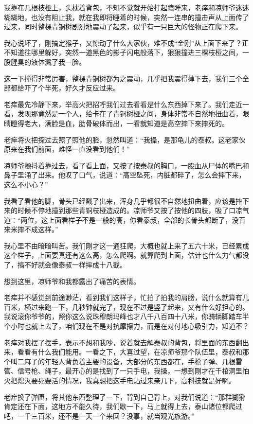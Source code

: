 我靠在几根枝桠上，头枕着背包，不知不觉就开始打起瞌睡来，老痒和凉师爷迷迷糊糊地，也没有阻止我，就在我即将睡着的时候，突然一连串的撞击声从上面传了过来，同时整棵青铜树剧烈地震动了起来，似乎有一只巨大的怪物正在爬下来。

我心说坏了，刚搞定猴子，又惊动了什么大家伙，难不成“金刚”从上面下来了？正不知道往哪里躲好，突然一道黑色的影子闪电般落下，狠狠撞进三棵枝桠之间，一股腥臭的液体溅了我一脸。

这一下撞得非常厉害，整棵青铜树都为之震动，几乎把我震得掉下去，我们三个全部都给吓了个半死，好久才反应过来。

老痒最先冷静下来，举高火把招呼我们过去看看是什么东西掉下来了。我们走近一看，发现那竟然是一个人，给卡在了青铜树桠之间，身体非常不自然地扭曲着，眼睛瞪得老大，满脸是血，肋骨破体而出，一看就知道是高空摔下来摔死的。

老痒将火把探过去照了照他的脸，忽然叫道：“我操，是那龟儿的泰叔。这老家伙原来在我们前面，难怪一直没看到他们！”

凉师爷颤抖着靠过去，看了看上面，又按了按泰叔的胸口，一股血从尸体的嘴巴和鼻子里涌了出来。他叹了口气，说道：“高空坠死，内脏都碎了，怎么会摔下来，这么不小心？”

我看了看他的脚，骨头已经戳了出来，浑身几乎都很不自然地扭曲着，应该是摔下来的时候不停地撞到那些青铜枝桠造成的。凉师爷又按了按他的四肢，吸了口凉气道：“两位，这上面看样子不是一般的高，你看泰叔，全部的长骨头都断了，没百来米摔不成这样。”

我心里不由暗暗叫苦。我们刚才这一通狂爬，大概也就上来了五六十米，已经累成这个样子，上面要真还有这么高，怎么爬啊。就算爬到上面，估计也什么力气都没了，搞不好就会像泰叔一样摔成十八截。

想到这里，凉师爷和我都露出了痛苦的表情。

老痒并不感觉到前途渺茫，看到我们这样子，忙拍了拍我的肩膀，说什么就算有几百米，横过来跑一下，几秒钟就完了，现在不过是竖了起来，又有什么好担心的。我说滚你爷爷的，照你这么说珠穆朗玛峰也才八千八百四十八米，你骑辆脚踏车半个小时也就上去了，咱们现在不是对抗摩擦力，而是在对付地心吸引力，知道不？

老痒对我摆了摆手，表示不想和我吵，说着就去解泰叔的背包，将里面的东西翻出来，看看有什么我们能用。一看之下，大喜过望，在凉师爷那个队伍里，泰叔和那个叫二麻子的年轻人背负着主要的设备，大部分的东西都在，手枪子弹、几根雷管、信号枪、绳子，最开心的是找到了一只手电，我操，一想到刚才在千棺洞里怕火把熄灭要死要活的情况，我真想把这手电贴过来亲几下，高科技就是好啊。

老痒换了弹匣，将其他东西整理了一下，背到自己背上，对我们说道：“那群猢狲肯定还在下面，这地方不能久待，我们歇一下，马上就得上去，泰山诸位都爬过吧，一千三百米，还不是一天一个来回？没事，就当观光旅游。”

